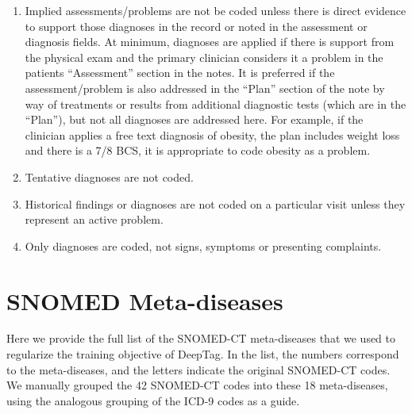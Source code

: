 \documentclass{article}[11pt,oneside]
\begin{document}
\begin{enumerate}

\item Implied assessments/problems are not be coded unless there is direct evidence to support those diagnoses in the record or noted in the assessment or diagnosis fields. At minimum, diagnoses are applied if there is support from the physical exam and the primary clinician considers it a problem in the patients “Assessment” section in the notes.  It is preferred if the assessment/problem is also addressed in the “Plan” section of the note by way of treatments or results from additional diagnostic tests (which are in the “Plan”), but not all diagnoses are addressed here. For example, if the clinician applies a free text diagnosis of obesity, the plan includes weight loss and there is a 7/8 BCS, it is appropriate to code obesity as a problem.

\item Tentative diagnoses are not coded.

\item Historical findings or diagnoses are not coded on a particular visit unless they represent an active problem.

\item Only diagnoses are coded, not signs, symptoms or presenting complaints.
\end{enumerate}

\section{SNOMED Meta-diseases}

Here we provide the full list of the SNOMED-CT meta-diseases that we used to regularize the training objective of DeepTag. In the list, the numbers correspond to the meta-diseases, and the letters indicate the original SNOMED-CT codes. We manually grouped the 42 SNOMED-CT codes into these 18 meta-diseases, using the analogous grouping of the ICD-9 codes as a guide. 
\end{document}
